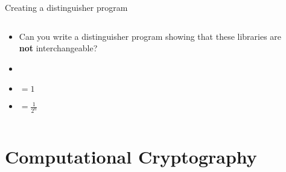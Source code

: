 \documentclass[aspectratio=169, lualatex, handout]{beamer}
\begin{document}
\begin{frame}{Creating a distinguisher program}
	\begin{columns}[c]
		\begin{column}{0.5\textwidth}
			\begin{itemize}
				\item Can you write a distinguisher program showing that these libraries are \textbf{not} interchangeable?
				\item {}
				\item {} $= 1$
				\item {} $= \frac{1}{2^n}$
			\end{itemize}
		\end{column}
		\begin{column}{0.5\textwidth}
			\begin{center}
			\end{center}
		\end{column}
	\end{columns}
\end{frame}

\section{Computational Cryptography}
\end{document}
